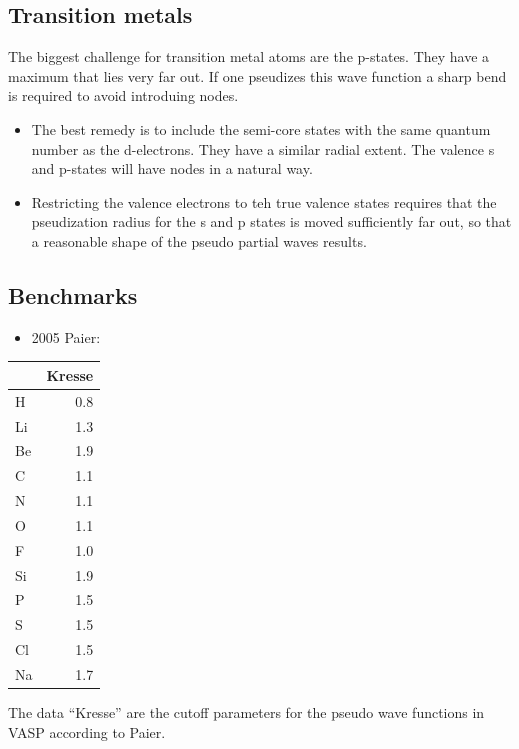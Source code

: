 \documentclass[11pt,a4paper]{report}
\begin{document}
\subsection{Transition metals}
The biggest challenge for transition metal atoms are the
p-states. They have a maximum that lies very far out. If one pseudizes
this wave function a sharp bend is required to avoid introduing nodes.
\begin{itemize}
\item The best remedy is to include the semi-core states with the same
  quantum number as the d-electrons. They have a similar radial
  extent. The valence s and p-states will have nodes in a natural way.
%
\item Restricting the valence electrons to teh true valence states
  requires that the pseudization radius for the s and p states is
  moved sufficiently far out, so that a reasonable shape of the pseudo
  partial waves results.
\end{itemize}

\subsection{Benchmarks}


\begin{itemize}
\item 2005 Paier\cite{paier05_jcp122_234102}: 
\end{itemize}


\begin{center}
\begin{tabular}{|l|r|}
\hline
& Kresse \\
\hline
H  & 0.8 \\
Li & 1.3 \\
Be & 1.9 \\
C  & 1.1 \\
N  & 1.1 \\
O  & 1.1 \\
F  & 1.0 \\
Si & 1.9 \\
P  & 1.5 \\
S  & 1.5 \\
Cl & 1.5 \\
Na & 1.7 \\
\hline
\end{tabular}
\end{center}
The data ``Kresse'' are the cutoff parameters for the pseudo wave
functions in VASP according to Paier\cite{paier05_jcp122_234102}.
\end{document}
